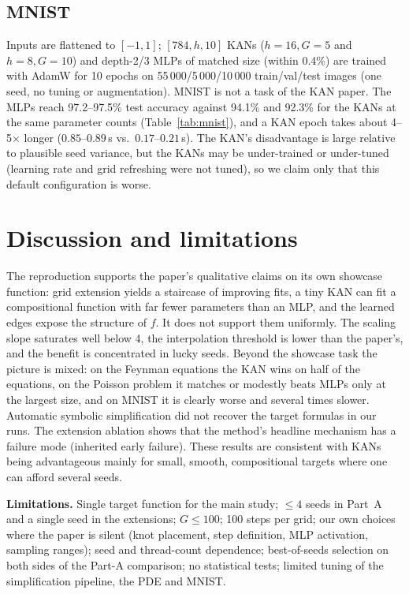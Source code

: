 \subsection{MNIST}
Inputs are flattened to $[-1,1]$; $[784,h,10]$ KANs ($h{=}16,G{=}5$ and $h{=}8,G{=}10$) and depth-2/3 MLPs of matched size (within 0.4\%) are trained with AdamW for 10 epochs on 55\,000/5\,000/10\,000 train/val/test images (one seed, no tuning or augmentation). MNIST is not a task of the KAN paper. The MLPs reach 97.2--97.5\% test accuracy against 94.1\% and 92.3\% for the KANs at the same parameter counts (Table~\ref{tab:mnist}), and a KAN epoch takes about 4--5$\times$ longer ($0.85$--$0.89$\,s vs.\ $0.17$--$0.21$\,s). The KAN's disadvantage is large relative to plausible seed variance, but the KANs may be under-trained or under-tuned (learning rate and grid refreshing were not tuned), so we claim only that this default configuration is worse.



\section{Discussion and limitations}
The reproduction supports the paper's qualitative claims on its own showcase function: grid extension yields a staircase of improving fits, a tiny KAN can fit a compositional function with far fewer parameters than an MLP, and the learned edges expose the structure of $f$. It does not support them uniformly. The scaling slope saturates well below 4, the interpolation threshold is lower than the paper's, and the benefit is concentrated in lucky seeds. Beyond the showcase task the picture is mixed: on the Feynman equations the KAN wins on half of the equations, on the Poisson problem it matches or modestly beats MLPs only at the largest size, and on MNIST it is clearly worse and several times slower. Automatic symbolic simplification did not recover the target formulas in our runs. The extension ablation shows that the method's headline mechanism has a failure mode (inherited early failure). These results are consistent with KANs being advantageous mainly for small, smooth, compositional targets where one can afford several seeds.

\textbf{Limitations.} Single target function for the main study; $\le4$ seeds in Part~A and a single seed in the extensions; $G\le100$; 100 steps per grid; our own choices where the paper is silent (knot placement, step definition, MLP activation, sampling ranges); seed and thread-count dependence; best-of-seeds selection on both sides of the Part-A comparison; no statistical tests; limited tuning of the simplification pipeline, the PDE and MNIST.


